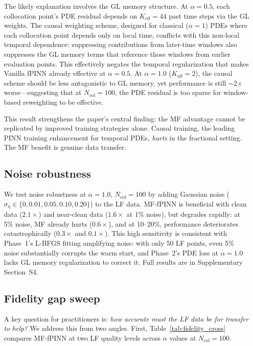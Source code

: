 \documentclass[preprint,12pt]{elsarticle}
\newcommand{\Ncol}{N_{\mathrm{col}}}
\begin{document}
The likely explanation involves the GL memory structure. At $\alpha = 0.5$, each collocation point's PDE residual depends on $K_{\mathrm{eff}} = 44$ past time steps via the GL weights. The causal weighting scheme, designed for classical ($\alpha = 1$) PDEs where each collocation point depends only on local time, conflicts with this non-local temporal dependence: suppressing contributions from later-time windows also suppresses the GL memory terms that reference those windows from earlier evaluation points. This effectively negates the temporal regularization that makes Vanilla fPINN already effective at $\alpha = 0.5$. At $\alpha = 1.0$ ($K_{\mathrm{eff}} = 2$), the causal scheme should be less antagonistic to GL memory, yet performance is still $\sim$2$\times$ worse---suggesting that at $\Ncol = 100$, the PDE residual is too sparse for window-based reweighting to be effective.

This result strengthens the paper's central finding: the MF advantage cannot be replicated by improved training strategies alone. Causal training, the leading PINN training enhancement for temporal PDEs, \emph{hurts} in the fractional setting. The MF benefit is genuine data transfer.

\subsection{Noise robustness}
\label{sec:noise}

We test noise robustness at $\alpha = 1.0$, $\Ncol = 100$ by adding Gaussian noise ($\sigma_\eta \in \{0, 0.01, 0.05, 0.10, 0.20\}$) to the LF data. MF-fPINN is beneficial with clean data ($2.1\times$) and near-clean data ($1.6\times$ at 1\% noise), but degrades rapidly: at 5\% noise, MF already hurts ($0.6\times$), and at 10--20\%, performance deteriorates catastrophically ($0.3\times$ and $0.1\times$). This high sensitivity is consistent with Phase~1's L-BFGS fitting amplifying noise: with only 50 LF points, even 5\% noise substantially corrupts the warm start, and Phase~2's PDE loss at $\alpha = 1.0$ lacks GL memory regularization to correct it. Full results are in Supplementary Section~S4.

\subsection{Fidelity gap sweep}
\label{sec:fidelity}

A key question for practitioners is: \emph{how accurate must the LF data be for transfer to help?} We address this from two angles. First, Table~\ref{tab:fidelity_cross} compares MF-fPINN at two LF quality levels across $\alpha$ values at $\Ncol = 100$.
\end{document}
